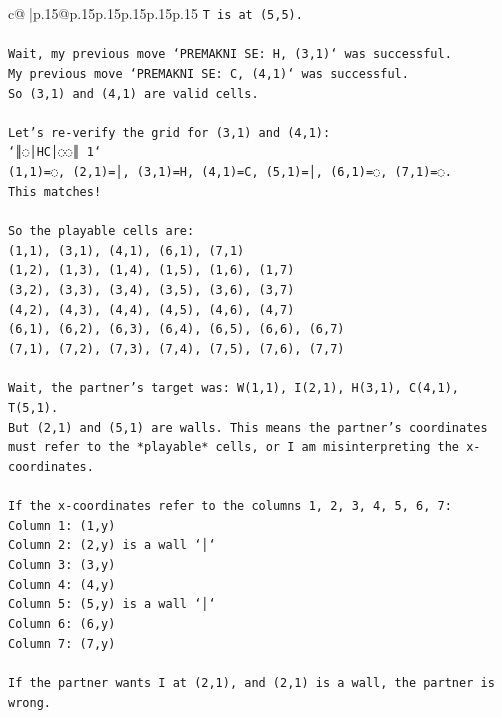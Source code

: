 \documentclass{article}
\begin{document}
{\begin{supertabular}{c@{$\;$}|p{.15\linewidth}@{}p{.15\linewidth}p{.15\linewidth}p{.15\linewidth}p{.15\linewidth}p{.15\linewidth}}
{{{\texttt{T is at (5,5).} \\
\\ 
\texttt{Wait, my previous move `PREMAKNI SE: H, (3,1)` was successful.} \\
\texttt{My previous move `PREMAKNI SE: C, (4,1)` was successful.} \\
\texttt{So (3,1) and (4,1) are valid cells.} \\
\\ 
\texttt{Let's re{-}verify the grid for (3,1) and (4,1):} \\
\texttt{`║◌│HC│◌◌║ 1`} \\
\texttt{(1,1)=◌, (2,1)=│, (3,1)=H, (4,1)=C, (5,1)=│, (6,1)=◌, (7,1)=◌.} \\
\texttt{This matches!} \\
\\ 
\texttt{So the playable cells are:} \\
\texttt{(1,1), (3,1), (4,1), (6,1), (7,1)} \\
\texttt{(1,2), (1,3), (1,4), (1,5), (1,6), (1,7)} \\
\texttt{(3,2), (3,3), (3,4), (3,5), (3,6), (3,7)} \\
\texttt{(4,2), (4,3), (4,4), (4,5), (4,6), (4,7)} \\
\texttt{(6,1), (6,2), (6,3), (6,4), (6,5), (6,6), (6,7)} \\
\texttt{(7,1), (7,2), (7,3), (7,4), (7,5), (7,6), (7,7)} \\
\\ 
\texttt{Wait, the partner's target was: W(1,1), I(2,1), H(3,1), C(4,1), T(5,1).} \\
\texttt{But (2,1) and (5,1) are walls. This means the partner's coordinates must refer to the *playable* cells, or I am misinterpreting the x{-}coordinates.} \\
\\ 
\texttt{If the x{-}coordinates refer to the columns 1, 2, 3, 4, 5, 6, 7:} \\
\texttt{Column 1: (1,y)} \\
\texttt{Column 2: (2,y) is a wall `│`} \\
\texttt{Column 3: (3,y)} \\
\texttt{Column 4: (4,y)} \\
\texttt{Column 5: (5,y) is a wall `│`} \\
\texttt{Column 6: (6,y)} \\
\texttt{Column 7: (7,y)} \\
\\ 
\texttt{If the partner wants I at (2,1), and (2,1) is a wall, the partner is wrong.} \\
}}}
\end{supertabular}}
\end{document}
